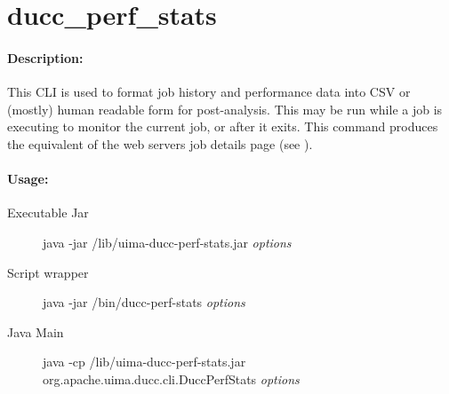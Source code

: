 \ifpdf
\else
{}
\fi
    \section{ducc\_perf\_stats}

    \paragraph{Description:}
    This CLI is used to format job history and performance data into CSV or (mostly) human readable
    form for post-analysis.  This may be run while a job is executing to monitor the current job, or
    after it exits.  This command produces the equivalent of the web servers job details page (see
    ).

    \paragraph{Usage:}
    \begin{description}
    \item[Executable Jar] java -jar \ducchome/lib/uima-ducc-perf-stats.jar {\em options}
    \item[Script wrapper] java -jar \ducchome/bin/ducc-perf-stats {\em options}
    \item[Java Main]      java -cp \ducchome/lib/uima-ducc-perf-stats.jar org.apache.uima.ducc.cli.DuccPerfStats {\em options}
    \end{description}

